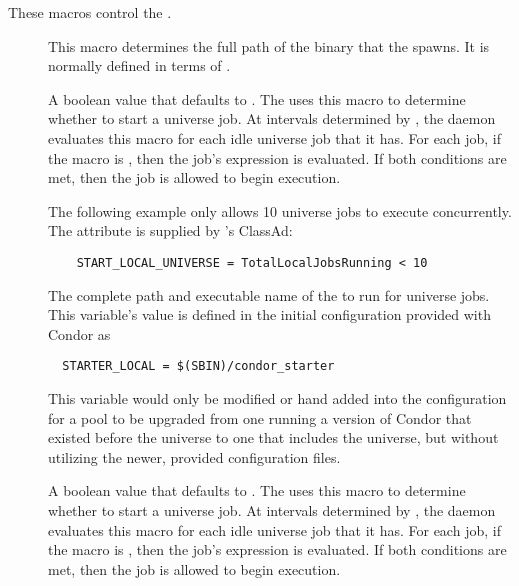 These macros control the .
\begin{description}

\item[] \label{param:Shadow} This macro determines the
  full path of the  binary that the 
  spawns.  It is normally defined in terms of . 
  
\item[] \label{param:StartLocalUniverse}
  A boolean value that defaults to .
  The  uses this macro to determine whether to start
  a  universe job. 
  At intervals determined by , 
  the  daemon evaluates this macro
  for each idle  universe job that it has.
  For each job, if the  
  macro is , then the job's  expression
  is evaluated. If both conditions are met, then the job is allowed
  to begin execution. 
  
  The following example only allows 10  universe jobs to
  execute concurrently. The attribute 
  is supplied by 's ClassAd:
  
  \footnotesize
  \begin{verbatim}
    START_LOCAL_UNIVERSE = TotalLocalJobsRunning < 10
  \end{verbatim}
  \normalsize
  
\item[] \label{param:StarterLocal}
  The complete path and executable name of the  to
  run for  universe jobs.  This variable's value
  is defined in the initial configuration provided with Condor as
  \footnotesize
  \begin{verbatim}
  STARTER_LOCAL = $(SBIN)/condor_starter
  \end{verbatim}
  \normalsize
  This variable would only be modified or hand added into 
  the configuration for a pool to be upgraded from one
  running a version of Condor that existed before the
   universe to one that includes the
   universe, but without utilizing the newer, provided
  configuration files.

\item[] \label{param:StartSchedulerUniverse}
  A boolean value that defaults to .
  The  uses this macro to determine whether to start
  a  universe job. 
  At intervals determined by , 
  the  daemon evaluates this macro
  for each idle  universe job that it has.
  For each job, if the  
  macro is , then the job's  expression
  is evaluated. If both conditions are met, then the job is allowed
  to begin execution. 
  

\end{description}
